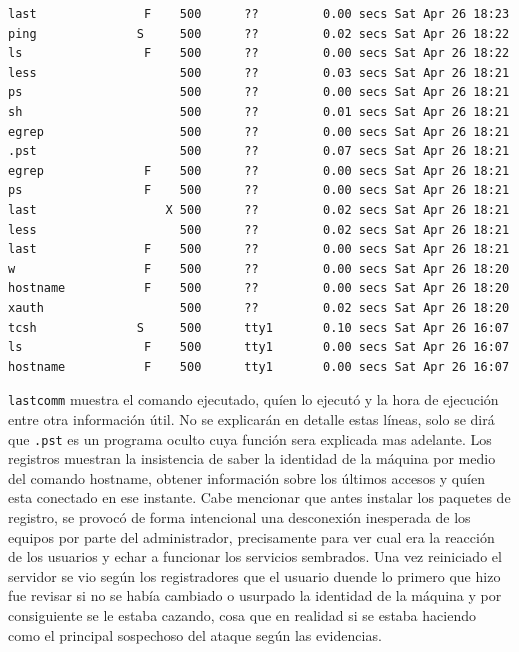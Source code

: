 \begin{lstlisting}[style=terminal]
last               F    500      ??         0.00 secs Sat Apr 26 18:23
ping              S     500      ??         0.02 secs Sat Apr 26 18:22
ls                 F    500      ??         0.00 secs Sat Apr 26 18:22
less                    500      ??         0.03 secs Sat Apr 26 18:21
ps                      500      ??         0.00 secs Sat Apr 26 18:21
sh                      500      ??         0.01 secs Sat Apr 26 18:21
egrep                   500      ??         0.00 secs Sat Apr 26 18:21
.pst                    500      ??         0.07 secs Sat Apr 26 18:21
egrep              F    500      ??         0.00 secs Sat Apr 26 18:21
ps                 F    500      ??         0.00 secs Sat Apr 26 18:21
last                  X 500      ??         0.02 secs Sat Apr 26 18:21
less                    500      ??         0.02 secs Sat Apr 26 18:21
last               F    500      ??         0.00 secs Sat Apr 26 18:21
w                  F    500      ??         0.00 secs Sat Apr 26 18:20
hostname           F    500      ??         0.00 secs Sat Apr 26 18:20
xauth                   500      ??         0.02 secs Sat Apr 26 18:20
tcsh              S     500      tty1       0.10 secs Sat Apr 26 16:07
ls                 F    500      tty1       0.00 secs Sat Apr 26 16:07
hostname           F    500      tty1       0.00 secs Sat Apr 26 16:07
\end{lstlisting}

\vspace{1em}

 \texttt{lastcomm} muestra el comando ejecutado, quíen lo ejecutó y la hora 
de ejecución entre otra información útil. No se explicarán en detalle estas 
líneas, solo se dirá que \texttt{.pst} es un
programa oculto cuya función sera explicada mas adelante. Los registros
muestran la insistencia de saber la identidad de la máquina por medio
del comando hostname, obtener información sobre los últimos accesos y
quíen esta conectado en ese instante. Cabe mencionar que antes
instalar los paquetes de registro, se provocó de forma intencional una
desconexión inesperada de los equipos por parte del administrador,
precisamente para ver cual era la reacción de los usuarios y echar a
funcionar los servicios sembrados. Una vez reiniciado el servidor se
vio según los registradores que el usuario duende lo primero que hizo
fue revisar si no se había cambiado o usurpado la identidad de la
máquina y por consiguiente se le estaba cazando, cosa que en realidad si
se estaba haciendo como el principal sospechoso del ataque según las evidencias.


